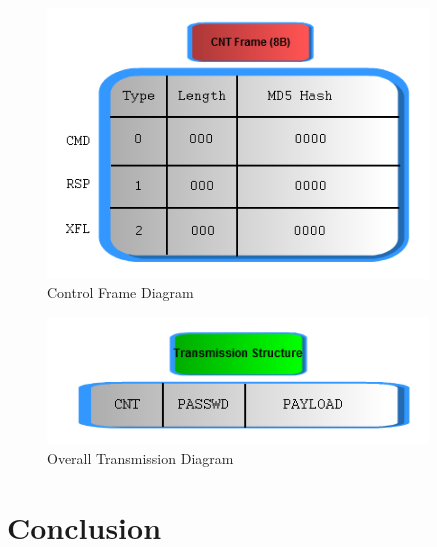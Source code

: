 \documentclass[titlepage]{article}
\begin{document}
\begin{figure}[htb]                                                                       
  \begin{center}
    \includegraphics[width=0.9\textwidth]{imgs/frame.png}
  \end{center}
  \caption{Control Frame Diagram}
  \label{fig:frame}
\end{figure}

\begin{figure}[htb]                                                                       
  \begin{center}
    \includegraphics[width=0.9\textwidth]{imgs/transmission.png}
  \end{center}
  \caption{Overall Transmission Diagram}
  \label{fig:transmission}
\end{figure}

\section{Conclusion}
\end{document}
